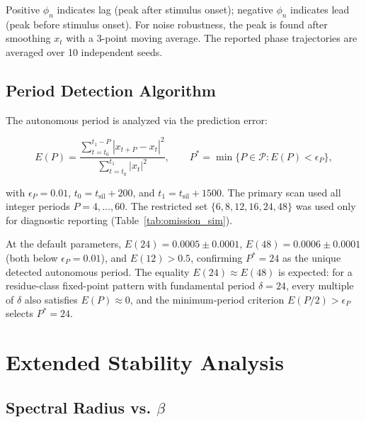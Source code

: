 \documentclass[12pt,a4paper]{article}
\begin{document}
Positive $\phi_n$ indicates lag (peak after stimulus onset); negative $\phi_n$ indicates lead (peak before stimulus onset). For noise robustness, the peak is found after smoothing $x_t$ with a 3-point moving average. The reported phase trajectories are averaged over 10 independent seeds.



\subsection{Period Detection Algorithm}

\label{sec:period_detection}



The autonomous period is analyzed via the prediction error:

\[

E(P) = \frac{\sum_{t=t_0}^{t_1-P} |x_{t+P} - x_t|^2}{\sum_{t=t_0}^{t_1} |x_t|^2},\qquad

P^* = \min\{P \in \mathcal{P} : E(P) < \epsilon_P\},

\]

with $\epsilon_P = 0.01$, $t_0 = t_{\mathrm{sil}} + 200$, and $t_1 = t_{\mathrm{sil}} + 1500$. The primary scan used all integer periods $P=4,\ldots,60$. The restricted set $\{6,8,12,16,24,48\}$ was used only for diagnostic reporting (Table~\ref{tab:omission_sim}).



At the default parameters, $E(24) = 0.0005 \pm 0.0001$, $E(48) = 0.0006 \pm 0.0001$ (both below $\epsilon_P = 0.01$), and $E(12) > 0.5$, confirming $P^* = 24$ as the unique detected autonomous period. The equality $E(24) \approx E(48)$ is expected: for a residue-class fixed-point pattern with fundamental period $\delta = 24$, every multiple of $\delta$ also satisfies $E(P) \approx 0$, and the minimum-period criterion $E(P/2) > \epsilon_P$ selects $P^* = 24$.



\section{Extended Stability Analysis}
\label{sec:stability_extended}




\subsection{Spectral Radius vs. $\beta$}
\end{document}
